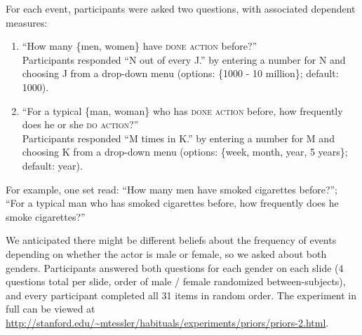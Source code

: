 \documentclass[10pt,letterpaper]{article}
\newcommand{\ndg}[1]{\textcolor{Green}{[ndg: #1]}}
\begin{document}
For each event, participants were asked two questions, with associated dependent measures:
\begin{enumerate}
\vspace{-1.0ex}
\itemsep0em%
\item ``How many \{men, women\} have \textsc{done action} before?'' \\
Participants responded ``N out of every J.'' by entering a number for N and choosing J from a drop-down menu (options: \{1000 - 10 million\}; default: 1000).
% 
\item ``For a typical \{man, woman\} who has \textsc{done action}  before, how frequently does he or she \textsc{do action}?''\\  
Participants responded ``M times in K.'' by entering a number for M and choosing K from a drop-down menu (options: \{week, month, year, 5 years\}; default: year).
%
\end{enumerate}
\vspace{-1.0ex}
For example, one set read: ``How many men have smoked cigarettes before?''; ``For a typical man who has smoked cigarettes before, how frequently does he smoke cigarettes?''

We anticipated there might be different beliefs about the frequency of events depending on whether the actor is male or female, so we asked about both genders. Participants answered both questions for each gender on each slide (4 questions total per slide, order of male / female randomized between-subjects), and every participant completed all 31 items in random order.
The experiment in full can be viewed at \url{http://stanford.edu/~mtessler/habituals/experiments/priors/priors-2.html}.
\end{document}
